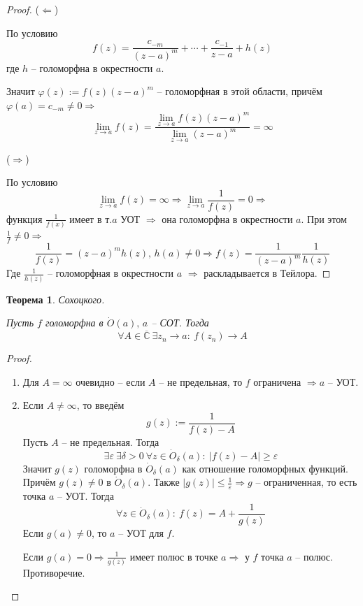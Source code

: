 \documentclass[a4paper,12pt]{article}
\renewcommand{\phi}{\ensuremath{\varphi}}
\renewcommand{\leq}{\ensuremath{\leqslant}}
\renewcommand{\geq}{\ensuremath{\geqslant}}
\theoremstyle{plain}
\newtheorem{theorem}{Теорема}[section]
\theoremstyle{definition}
\theoremstyle{remark}
\begin{document}
\begin{proof}
	($\Leftarrow$)

	По условию
	\[
		f(z) = \frac{c_{-m}}{(z - a)^m} + \cdots + \frac{c_{-1}}{z -a} + h(z)
	\]
	где $h$ -- голоморфна в окрестности $a$.

	Значит $\phi(z) := f(z)(z - a)^m$ -- голоморфная в этой области, причём $\phi(a) = c_{-m} \neq 0 \Rightarrow$
	\[
		\lim_{z \to a}f(z) = \frac{\lim_{z \to a} f(z)(z - a)^m}{\lim_{z \to a} (z - a)^m} = \infty
	\]

	($\Rightarrow$)

	По условию
	\[
		\lim_{z \to a} f(z) = \infty \Rightarrow \lim_{z \to a}\frac{1}{f(z)} = 0 \Rightarrow
	\]
	функция $\frac{1}{f(x)}$ имеет в т.$a$ УОТ $\Rightarrow$ она голоморфна в окрестности $a$. При этом $\frac{1}{f} \neq 0 \Rightarrow$
	\[
		\frac{1}{f(z)} = (z - a)^mh(z),\, h(a) \neq 0 \Rightarrow f(z) = \frac{1}{(z - a)^m}\frac{1}{h(z)}
	\]
	Где $\frac{1}{h(z)}$ -- голоморфная в окрестности $a$ $\Rightarrow$ раскладывается в Тейлора.
\end{proof}

\begin{theorem}
	Сохоцкого.

	Пусть $f$ голоморфна в $\dot{O}(a),\, a$ -- СОТ. Тогда
	\[
		\forall A \in \overline{\mathbb{C}} \: \exists z_n \to a :\: f(z_n) \to A
	\]
\end{theorem}

\begin{proof}
	\begin{enumerate}
		\item Для $A = \infty$ очевидно -- если $A$ -- не предельная, то $f$ ограничена $\Rightarrow a$ -- УОТ.
		\item Если $A \neq \infty$, то введём
		      \[
			      g(z) := \frac{1}{f(z) - A}
		      \]
		      Пусть $A$ -- не предельная. Тогда
		      \[
			      \exists \varepsilon \: \exists \delta > 0 \: \forall z \in \dot{O}_\delta(a) :\: \vert f(z) - A\vert \geq \varepsilon
		      \]
		      Значит $g(z)$ голоморфна в $\dot{O}_\delta(a)$ как отношение голоморфных функций. Причём $g(z) \neq 0$ в $\dot{O}_\delta(a)$. Также $\vert g(z)\vert \leq \frac{1}{\varepsilon} \Rightarrow g$ -- ограниченная, то есть точка $a$ -- УОТ. Тогда
		      \[
			      \forall z \in \dot{O}_\delta(a) :\: f(z) = A + \frac{1}{g(z)}
		      \]
		      Если $g(a) \neq 0$, то $a$ -- УОТ для $f$.

		      Если $g(a) = 0 \Rightarrow \frac{1}{g(z)}$ имеет полюс в точке $a \Rightarrow$ у $f$ точка $a$ -- полюс. Противоречие.
	\end{enumerate}
\end{proof}
\end{document}
